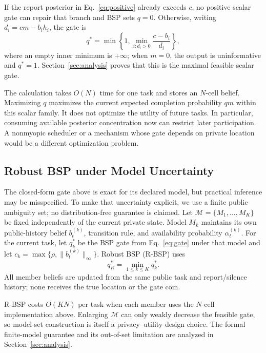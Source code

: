 \documentclass[10pt,journal,compsoc]{IEEEtran}
\begin{document}
If the report posterior in Eq.~\eqref{eq:positive} already exceeds $c$, no positive scalar gate can repair that branch and BSP sets $q=0$. Otherwise, writing $d_i=cm-b_i h_i$, the gate is
\begin{equation}
 q^*=\min\left\{1,\min_{i:d_i>0}\frac{c-b_i}{d_i}\right\},
 \label{eq:gate}
\end{equation}
where an empty inner minimum is $+\infty$; when $m=0$, the output is uninformative and $q^*=1$. Section~\ref{sec:analysis} proves that this is the maximal feasible scalar gate.

The calculation takes $O(N)$ time for one task and stores an $N$-cell belief. Maximizing $q$ maximizes the current expected completion probability $qm$ within this scalar family. It does not optimize the utility of future tasks. In particular, consuming available posterior concentration now can restrict later participation. A nonmyopic scheduler or a mechanism whose gate depends on private location would be a different optimization problem.

\subsection{Robust BSP under Model Uncertainty}
\label{sec:robust}
The closed-form gate above is exact for its declared model, but practical inference may be misspecified. To make that uncertainty explicit, we use a finite public ambiguity set; no distribution-free guarantee is claimed. Let $\mathcal M=\{M_1,\ldots,M_K\}$ be fixed independently of the current private state. Model $M_k$ maintains its own public-history belief $b_t^{(k)}$, transition rule, and availability probability $\alpha_t^{(k)}$. For the current task, let $q_k^*$ be the BSP gate from Eq.~\eqref{eq:gate} under that model and let $c_k=\max\{\rho,\|b_t^{(k)}\|_\infty\}$. Robust BSP (R-BSP) uses
\begin{equation}
 q_R^*=\min_{1\le k\le K} q_k^*.
 \label{eq:robust-gate}
\end{equation}
All member beliefs are updated from the same public task and report/silence history; none receives the true location or the gate coin.

R-BSP costs $O(KN)$ per task when each member uses the $N$-cell implementation above. Enlarging $\mathcal M$ can only weakly decrease the feasible gate, so model-set construction is itself a privacy--utility design choice. The formal finite-model guarantee and its out-of-set limitation are analyzed in Section~\ref{sec:analysis}.
\end{document}
